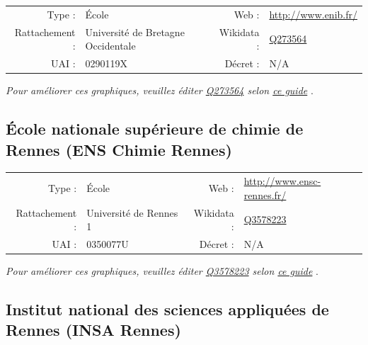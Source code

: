 \documentclass[11pt,french,landscape]{article}
\begin{document}
\begin{tabular*}{0.45\textwidth}{rp{2cm}rl}  
\hline  
Type : & École & Web : &\href{http://www.enib.fr/}{http://www.enib.fr/} \\  
Rattachement : & Université de Bretagne Occidentale & Wikidata : & \href{https://www.wikidata.org/entity/Q273564}{Q273564} \\  
UAI : & 0290119X & Décret : & N/A \\  
\hline  
\end{tabular*}

\textit{\scriptsize Pour améliorer ces graphiques, veuillez éditer \href{https://www.wikidata.org/entity/Q273564}{Q273564}  selon \href{https://github.com/cpesr/wikidataESR/blob/master/Rmd/wikidataESR.md}{ce guide}}
.


\newpage

\hypertarget{uxe9cole-nationale-supuxe9rieure-de-chimie-de-rennes-ens-chimie-rennes}{%
\subsection{École nationale supérieure de chimie de Rennes (ENS Chimie
Rennes)}\label{uxe9cole-nationale-supuxe9rieure-de-chimie-de-rennes-ens-chimie-rennes}}

\begin{tabular*}{0.45\textwidth}{rp{2cm}rl}  
\hline  
Type : & École & Web : &\href{http://www.ensc-rennes.fr/}{http://www.ensc-rennes.fr/} \\  
Rattachement : & Université de Rennes 1 & Wikidata : & \href{https://www.wikidata.org/entity/Q3578223}{Q3578223} \\  
UAI : & 0350077U & Décret : & N/A \\  
\hline  
\end{tabular*}

\textit{\scriptsize Pour améliorer ces graphiques, veuillez éditer \href{https://www.wikidata.org/entity/Q3578223}{Q3578223}  selon \href{https://github.com/cpesr/wikidataESR/blob/master/Rmd/wikidataESR.md}{ce guide}}
.


\newpage

\hypertarget{institut-national-des-sciences-appliquuxe9es-de-rennes-insa-rennes}{%
\subsection{Institut national des sciences appliquées de Rennes (INSA
Rennes)}\label{institut-national-des-sciences-appliquuxe9es-de-rennes-insa-rennes}}
\end{document}
